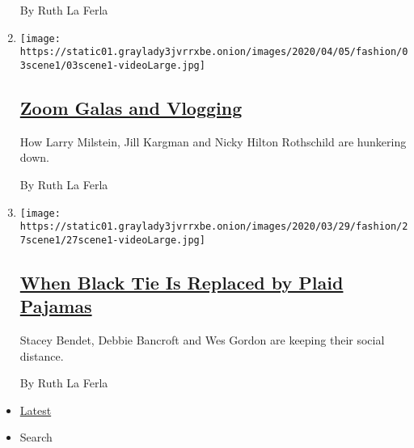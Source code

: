 \begin{enumerate}
  By Ruth La Ferla
\item
  \texttt{[image: https://static01.graylady3jvrrxbe.onion/images/2020/04/05/fashion/03scene1/03scene1-videoLarge.jpg]}

  \hypertarget{zoom-galas-and-vlogging}{%
  \subsection{\texorpdfstring{\href{/2020/04/03/style/zoom-galas-and-vlogging.html}{Zoom
  Galas and
  Vlogging}}{Zoom Galas and Vlogging}}\label{zoom-galas-and-vlogging}}

  How Larry Milstein, Jill Kargman and Nicky Hilton Rothschild are
  hunkering down.

  By Ruth La Ferla
\item
  \texttt{[image: https://static01.graylady3jvrrxbe.onion/images/2020/03/29/fashion/27scene1/27scene1-videoLarge.jpg]}

  \hypertarget{when-black-tie-is-replaced-by-plaid-pajamas}{%
  \subsection{\texorpdfstring{\href{/2020/03/27/style/when-black-tie-is-replaced-by-plaid-pajamas.html}{When
  Black Tie Is Replaced by Plaid
  Pajamas}}{When Black Tie Is Replaced by Plaid Pajamas}}\label{when-black-tie-is-replaced-by-plaid-pajamas}}

  Stacey Bendet, Debbie Bancroft and Wes Gordon are keeping their social
  distance.

  By Ruth La Ferla
\end{enumerate}

\begin{itemize}
\tightlist
\item
  \protect\hyperlink{stream-panel}{Latest}
\item
  Search
\end{itemize}

